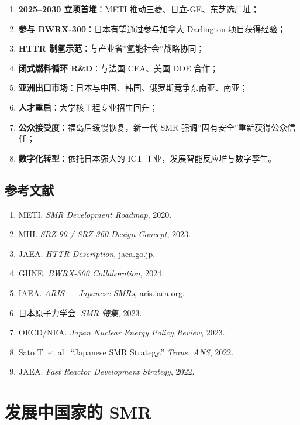 \documentclass[
  UTF8,
  scheme=plain,
  fontsize=10pt,
  openany
]{ctexbook}
\begin{document}
\begin{enumerate}
\def\labelenumi{\arabic{enumi}.}
\tightlist
\item
  \textbf{2025--2030 立项首堆}：METI 推动三菱、日立-GE、东芝选厂址；
\item
  \textbf{参与 BWRX-300}：日本有望通过参与加拿大 Darlington
  项目获得经验；
\item
  \textbf{HTTR 制氢示范}：与产业省''氢能社会''战略协同；
\item
  \textbf{闭式燃料循环 R\&D}：与法国 CEA、美国 DOE 合作；
\item
  \textbf{亚洲出口市场}：日本与中国、韩国、俄罗斯竞争东南亚、南亚；
\item
  \textbf{人才重启}：大学核工程专业招生回升；
\item
  \textbf{公众接受度}：福岛后缓慢恢复，新一代 SMR
  强调''固有安全''重新获得公众信任；
\item
  \textbf{数字化转型}：依托日本强大的 ICT
  工业，发展智能反应堆与数字孪生。
\end{enumerate}

\section{参考文献}\label{ux53c2ux8003ux6587ux732e-16}

\begin{enumerate}
\def\labelenumi{\arabic{enumi}.}
\tightlist
\item
  METI. \emph{SMR Development Roadmap}, 2020.
\item
  MHI. \emph{SRZ-90 / SRZ-360 Design Concept}, 2023.
\item
  JAEA. \emph{HTTR Description}, jaea.go.jp.
\item
  GHNE. \emph{BWRX-300 Collaboration}, 2024.
\item
  IAEA. \emph{ARIS --- Japanese SMRs}, aris.iaea.org.
\item
  日本原子力学会. \emph{SMR 特集}, 2023.
\item
  OECD/NEA. \emph{Japan Nuclear Energy Policy Review}, 2023.
\item
  Sato T. et al.~``Japanese SMR Strategy.'' \emph{Trans. ANS}, 2022.
\item
  JAEA. \emph{Fast Reactor Development Strategy}, 2022.
\end{enumerate}

\cleardoublepage

\chapter{发展中国家的
SMR}\label{ux53d1ux5c55ux4e2dux56fdux5bb6ux7684-smr}
\end{document}

